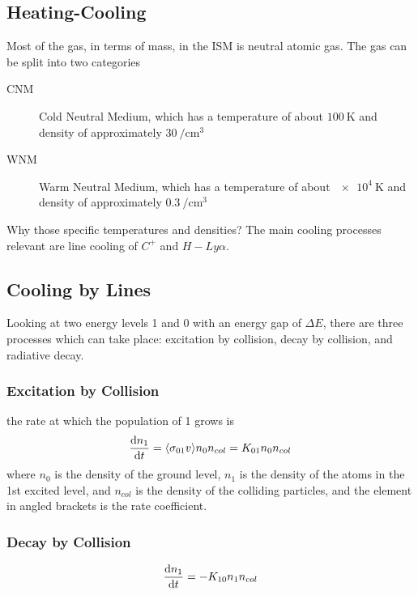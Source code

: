 \subsection{Heating-Cooling}
Most of the gas, in terms of mass, in the ISM is neutral atomic gas. The gas can be split into two categories
\begin{description}
    \item[CNM] Cold Neutral Medium, which has a temperature of about \(\qty{100}{\kelvin}\) and density of approximately \(\qty{30}{\per\centi\meter^3}\)
    \item[WNM] Warm Neutral Medium, which has a temperature of about \(\qty{e4}{\kelvin}\) and density of approximately \(\qty{0.3}{\per\centi\meter^3}\)
\end{description}
Why those specific temperatures and densities? The main cooling processes relevant are line cooling of \(C^+\) and \(H-Ly\alpha \).
\subsection{Cooling by Lines}
Looking at two energy levels 1 and 0 with an energy gap of \(\Delta E\), there are three processes which can take place: excitation by collision, decay by collision, and radiative decay.
\subsubsection{Excitation by Collision}
the rate at which the population of 1 grows is
\begin{align}
    \diff{n_1}{t} = \langle\sigma_{01}v\rangle n_0 n_{col} = K_{01}n_0 n_{col}
\end{align}
where \(n_0\) is the density of the ground level, \(n_1\) is the density of the atoms in the 1st excited level, and \(n_{col}\) is the density of the colliding particles, and the element in angled brackets is the rate coefficient.
\subsubsection{Decay by Collision}
\begin{align}
    \diff{n_1}{t} = - K_{10} n_1 n_{col}
\end{align}
